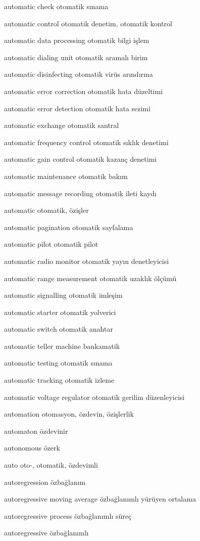 \documentclass[12pt,fleqn]{article}\usepackage{../../common}
\begin{document}
automatic check otomatik sınama

automatic control otomatik denetim, otomatik kontrol

automatic data processing otomatik bilgi işlem

automatic dialing unit otomatik aramalı birim

automatic disinfecting otomatik virüs arındırma

automatic error correction otomatik hata düzeltimi

automatic error detection otomatik hata sezimi

automatic exchange otomatik santral

automatic frequency control otomatik sıklık denetimi

automatic gain control otomatik kazanç denetimi

automatic maintenance otomatik bakım

automatic message recording otomatik ileti kaydı

automatic otomatik, özişler

automatic pagination otomatik sayfalama

automatic pilot otomatik pilot

automatic radio monitor otomatik yayın denetleyicisi

automatic range measurement otomatik uzaklık ölçümü

automatic signalling otomatik imleşim

automatic starter otomatik yolverici

automatic switch otomatik anahtar

automatic teller machine bankamatik

automatic testing otomatik sınama

automatic tracking otomatik izleme

automatic voltage regulator otomatik gerilim düzenleyicisi

automation otomasyon, özdevin, özişlerlik

automaton özdevinir

autonomous özerk

auto oto-, otomatik, özdevimli

autoregression özbağlanım

autoregressive moving average özbağlanımlı yürüyen ortalama

autoregressive process özbağlanımlı süreç

autoregressive özbağlanımlı
\end{document}
